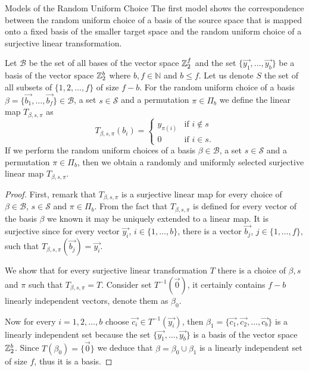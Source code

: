 \begin{section}{Models of the Random Uniform Choice}
The first model shows the correspondence between the random uniform choice of a basis of the source space that is mapped onto a fixed basis of the smaller target space and the random uniform choice of a surjective linear transformation.
\begin{remark}
\label{remark-model-surjective-linear-map-selection}
Let $\mathcal{B}$ be the set of all bases of the vector space $\mathbb{Z}_{2}^{f}$ and the set $\{\vec{y_1}, \dots, \vec{y_b}\}$ be a basis of the vector space $\mathbb{Z}_{2}^{b}$ where $b, f \in \mathbb{N}$ and $b \leq f$. Let us denote $S$ the set of all subsets of $\{1, 2, \dots, f\}$ of size $f - b$. For the random uniform choice of a basis $\beta = \{\vec{b_1}, \dots, \vec{b_f} \} \in \mathcal{B}$, a set $s \in \mathcal{S}$ and a permutation $\pi \in \Pi_b$ we define the linear map $T_{\beta, s, \pi}$ as
\[
T_{\beta, s, \pi}(b_i) =  
  \begin{cases} 
    y_{\pi(i)} & \text{if } i \notin s \\
    0 & \text{if } i \in s \text{.}
  \end{cases} 
\]
If we perform the random uniform choices of a basis $\beta \in \mathcal{B}$, a set $s \in \mathcal{S}$ and a permutation $\pi \in \Pi_b$, then we obtain a randomly and uniformly selected surjective linear map $T_{\beta, s, \pi}$.
\end{remark}
\begin{proof}
First, remark that $T_{\beta, s, \pi}$ is a surjective linear map for every choice of $\beta \in \mathcal{B}$, $s \in \mathcal{S}$ and $\pi \in \Pi_b$. From the fact that $T_{\beta, s, \pi}$ is defined for every vector of the basis $\beta$ we known it may be uniquely extended to a linear map. It is surjective since for every vector $\vec{y_i}$, $i \in \{1, \dots, b\}$, there is a vector $\vec{b_j}$, $j \in \{1, \dots, f\}$, such that $T_{\beta, s, \pi}(\vec{b_j}) = \vec{y_i}$. 

We show that for every surjective linear transformation $T$ there is a choice of $\beta, s$ and $\pi$ such that $T_{\beta, s, \pi} = T$. Consider set $T^{-1}(\vec{0})$, it certainly contains $f - b$ linearly independent vectors, denote them as $\beta_0$. 

Now for every $i = 1, 2, \dots, b$ choose $\vec{c_i} \in T^{-1}(\vec{y_i})$, then $\beta_1 = \{\vec{c_1}, \vec{c_2}, \dots, \vec{c_b}\}$ is a linearly independent set because the set $\{\vec{y_1}, \dots, \vec{y_b}\}$ is a basis of the vector space $\mathbb{Z}_{2}^{b}$. Since $T(\beta_0) = \{ \vec{0} \}$ we deduce that $\beta = \beta_0 \cup \beta_1$ is a linearly independent set of size $f$, thus it is a basis.


\end{proof}
\end{section}
